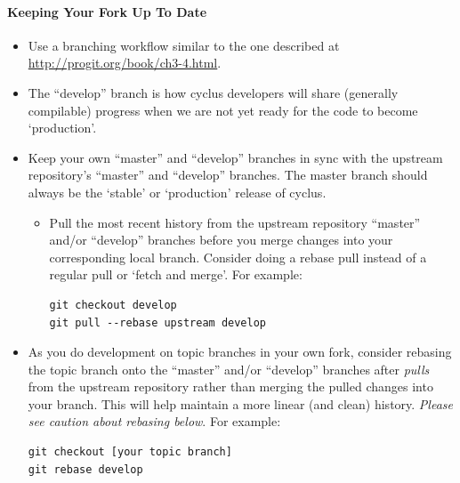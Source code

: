 \documentclass[letterpaper,10pt,english]{sphinxmanual}
\begin{document}
\paragraph{Keeping Your Fork Up To Date}
\label{devdoc/contributing_to_cyclus:keeping-your-fork-up-to-date}\begin{itemize}
\item {} 
Use a branching workflow similar to the one described at
\href{http://progit.org/book/ch3-4.html}{http://progit.org/book/ch3-4.html}.

\item {} 
The ``develop'' branch is how cyclus developers will share (generally compilable) progress
when we are not yet ready for the code to become `production'.

\item {} 
Keep your own ``master'' and ``develop'' branches in sync with the upstream repository's
``master'' and ``develop'' branches. The master branch should always be the `stable'
or `production' release of cyclus.
\begin{itemize}
\item {} 
Pull the most recent history from the upstream repository ``master''
and/or ``develop'' branches before you merge changes into your
corresponding local branch. Consider doing a rebase pull instead of
a regular pull or `fetch and merge'.  For example:

\begin{Verbatim}[commandchars=\\\{\}]
git checkout develop
git pull --rebase upstream develop
\end{Verbatim}

\end{itemize}

\item {} 
As you do development on topic branches in your own fork, consider rebasing
the topic branch onto the ``master'' and/or ``develop''  branches after \emph{pulls} from the upstream
repository rather than merging the pulled changes into your branch.  This
will help maintain a more linear (and clean) history.
\emph{Please see caution about rebasing below}.  For example:

\begin{Verbatim}[commandchars=\\\{\}]
git checkout [your topic branch]
git rebase develop
\end{Verbatim}

\end{itemize}
\end{document}
